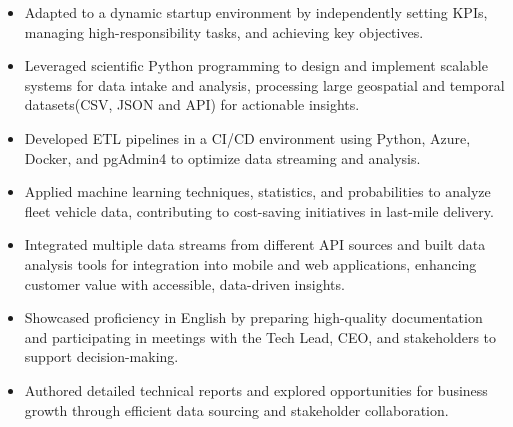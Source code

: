 \documentclass[10pt,a4paper,ragged2e,withhyper]{altacv}
\begin{document}
\begin{paracol}{2}


\begin{itemize}
    \item Adapted to a dynamic startup environment by independently setting KPIs, managing high-responsibility tasks, and achieving key objectives.
    \item Leveraged scientific Python programming to design and implement scalable systems for data intake and analysis, processing large geospatial and temporal datasets(CSV, JSON and API) for actionable insights.
    \item Developed ETL pipelines in a CI/CD environment using Python, Azure, Docker, and pgAdmin4 to optimize data streaming and analysis.
    \item Applied machine learning techniques, statistics, and probabilities to analyze fleet vehicle data, contributing to cost-saving initiatives in last-mile delivery.
    \item Integrated multiple data streams from different API sources and built data analysis tools for integration into mobile and web applications, enhancing customer value with accessible, data-driven insights.
    \item Showcased proficiency in English by preparing high-quality documentation and participating in meetings with the Tech Lead, CEO, and stakeholders to support decision-making.
    \item Authored detailed technical reports and explored opportunities for business growth through efficient data sourcing and stakeholder collaboration.
    
\end{itemize}


\end{paracol}
\end{document}
